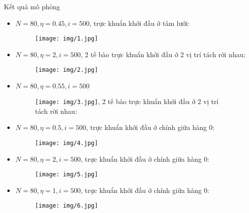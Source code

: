 \begin{frame}[allowframebreaks]{Kết quả mô phỏng}
\begin{itemize}
	\item $N = 80, \eta = 0.45, i = 500$, trực khuẩn khởi đầu ở tâm lưới:
    \begin{figure}[H]
        \centering
        \texttt{[image: img/1.jpg]}
    \end{figure}
\end{itemize}
\break
\begin{itemize}
    \item $N = 80, \eta = 2, i = 500$, 2 tế bào trực khuẩn khởi đầu ở 2 vị trí tách rời nhau:
    \begin{figure}[H]
        \centering
        \texttt{[image: img/2.jpg]}
    \end{figure}
\end{itemize}
\break
\begin{itemize}
    \item $N = 80, \eta = 0.55, i = 500$
    \begin{figure}[H]
        \centering
        \texttt{[image: img/3.jpg]}, 2 tế bào trực khuẩn khởi đầu ở 2 vị trí tách rời nhau:
    \end{figure}
\end{itemize}
\break
\begin{itemize}
    \item $N = 80, \eta = 0.5, i = 500$, trực khuẩn khởi đầu ở chính giữa hàng 0:
    \begin{figure}[H]
        \centering
        \texttt{[image: img/4.jpg]}
    \end{figure}
\end{itemize}
\break
\begin{itemize}
    \item $N = 80, \eta = 2, i = 500$, trực khuẩn khởi đầu ở chính giữa hàng 0:
    \begin{figure}[H]
        \centering
        \texttt{[image: img/5.jpg]}
    \end{figure}
\end{itemize}
\break
\begin{itemize}
    \item $N = 80, \eta = 1, i = 500$, trực khuẩn khởi đầu ở chính giữa hàng 0:
    \begin{figure}[H]
        \centering
        \texttt{[image: img/6.jpg]}
    \end{figure}
\end{itemize}
\end{frame}